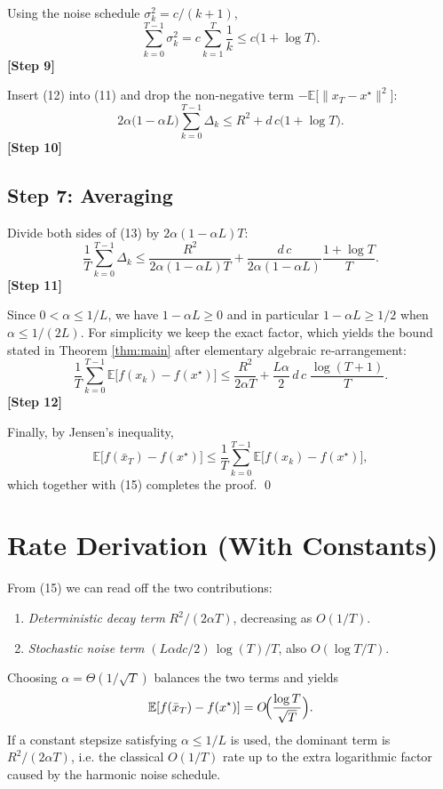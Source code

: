 \documentclass[11pt]{article}
\begin{document}
Using the noise schedule $\sigma_k^{2}=c/(k+1)$,
\[
\sum_{k=0}^{T-1}\sigma_k^{2}=c\sum_{k=1}^{T}\frac{1}{k}
\le c\bigl(1+\log T\bigr).
\tag{12}
\]
\textbf{[Step 9]}

Insert (12) into (11) and drop the non‑negative term $-\mathbb{E}\!\bigl[\|x_T-x^{\star}\|^{2}\bigr]$:
\[
2\alpha\bigl(1-\alpha L\bigr)\sum_{k=0}^{T-1}\Delta_k
\le R^{2}+ d\,c\bigl(1+\log T\bigr).
\tag{13}
\]
\textbf{[Step 10]}

\subsection*{Step 7: Averaging}
Divide both sides of (13) by $2\alpha(1-\alpha L)T$:
\[
\frac{1}{T}\sum_{k=0}^{T-1}\Delta_k
\le \frac{R^{2}}{2\alpha(1-\alpha L)T}
+\frac{d\,c}{2\alpha(1-\alpha L)}\frac{1+\log T}{T}.
\tag{14}
\]
\textbf{[Step 11]}

Since $0<\alpha\le 1/L$, we have $1-\alpha L\ge 0$ and in particular
$1-\alpha L\ge 1/2$ when $\alpha\le 1/(2L)$. For simplicity we keep the exact factor,
which yields the bound stated in Theorem \ref{thm:main} after elementary algebraic
re‑arrangement:
\[
\frac{1}{T}\sum_{k=0}^{T-1}\mathbb{E}\!\bigl[f(x_k)-f(x^{\star})\bigr]
\le \frac{R^{2}}{2\alpha T}
+\frac{L\alpha}{2}\,d\,c\;\frac{\log(T+1)}{T}.
\tag{15}
\]
\textbf{[Step 12]}

Finally, by Jensen’s inequality,
\[
\mathbb{E}\!\bigl[f(\bar x_T)-f(x^{\star})\bigr]
\le \frac{1}{T}\sum_{k=0}^{T-1}\mathbb{E}\!\bigl[f(x_k)-f(x^{\star})\bigr],
\]
which together with (15) completes the proof. \qed

\section*{Rate Derivation (With Constants)}
From (15) we can read off the two contributions:
\begin{enumerate}
\item \emph{Deterministic decay term} $R^{2}/(2\alpha T)$, decreasing as $O(1/T)$.
\item \emph{Stochastic noise term} $(L\alpha d c/2)\,\log(T)/T$, also $O(\log T/T)$.
\end{enumerate}
Choosing $\alpha = \Theta(1/\sqrt{T})$ balances the two terms and yields
\[
\mathbb{E}[f(\bar x_T)-f(x^{\star})]=O\!\Bigl(\frac{\log T}{\sqrt{T}}\Bigr).
\]
If a constant stepsize satisfying $\alpha\le 1/L$ is used, the dominant term is $R^{2}/(2\alpha T)$, i.e. the classical $O(1/T)$ rate up to the extra logarithmic factor caused by the harmonic noise schedule.
\end{document}
